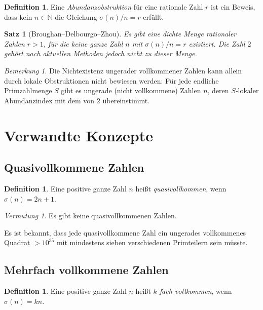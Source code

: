 \documentclass[12pt,a4paper]{amsart}
\newtheorem{satz}[theorem]{Satz}
\theoremstyle{definition}
\newtheorem{definition_de}[theorem]{Definition}
\theoremstyle{remark}
\newtheorem{bemerkung}[theorem]{Bemerkung}
\newtheorem{vermutung}[theorem]{Vermutung}
\newcommand{\N}{\mathbb{N}}
\begin{document}
\begin{definition_de}
Eine \emph{Abundanzobstruktion} für eine rationale Zahl $r$ ist ein Beweis,
dass kein $n \in \N$ die Gleichung $\sigma(n)/n = r$ erfüllt.
\end{definition_de}

\begin{satz}[Broughan--Delbourgo--Zhou]
Es gibt eine dichte Menge rationaler Zahlen $r > 1$, für die keine ganze
Zahl $n$ mit $\sigma(n)/n = r$ existiert. Die Zahl $2$ gehört nach
aktuellen Methoden jedoch nicht zu dieser Menge.
\end{satz}

\begin{bemerkung}
Die Nichtexistenz ungerader vollkommener Zahlen kann allein durch lokale
Obstruktionen nicht bewiesen werden: Für jede endliche Primzahlmenge $S$
gibt es ungerade (nicht vollkommene) Zahlen $n$, deren $S$-lokaler
Abundanzindex mit dem von $2$ übereinstimmt.
\end{bemerkung}

\section{Verwandte Konzepte}

\subsection{Quasivollkommene Zahlen}

\begin{definition_de}
Eine positive ganze Zahl $n$ heißt \emph{quasivollkommen}, wenn $\sigma(n) = 2n + 1$.
\end{definition_de}

\begin{vermutung}
Es gibt keine quasivollkommenen Zahlen.
\end{vermutung}

Es ist bekannt, dass jede quasivollkommene Zahl ein ungerades vollkommenes
Quadrat $> 10^{35}$ mit mindestens sieben verschiedenen Primteilern sein müsste.

\subsection{Mehrfach vollkommene Zahlen}

\begin{definition_de}
Eine positive ganze Zahl $n$ heißt \emph{$k$-fach vollkommen}, wenn
$\sigma(n) = kn$.
\end{definition_de}
\end{document}
